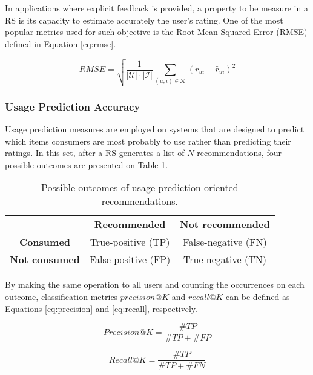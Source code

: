 In applications where explicit feedback is provided, a property to be measure in a RS is its capacity to estimate accurately the user's rating. One of the most popular metrics used for such objective is the Root Mean Squared Error (RMSE)  defined in Equation \ref{eq:rmse}.

\begin{equation}
\label{eq:rmse}
    RMSE = \sqrt{\frac{1}{|\mathcal{U}| \cdot |\mathcal{I}|}\sum_{(u,i) \in \mathcal{K}}(r_{ui} - \hat{r}_{ui})^2}
\end{equation}

\subsubsection{Usage Prediction Accuracy}

Usage prediction measures are employed on systems that are designed to predict which items consumers are most probably to use rather than predicting their ratings. In this set, after a RS generates a list of $N$ recommendations, four possible outcomes are presented on Table \ref{tab:usage_table}.

\begin{table}[h]
	\centering
	\begin{tabular}{@{}ccc@{}}
		& \textbf{Recommended}                     & \textbf{Not recommended}                 \\ 
		\multicolumn{1}{c|}{\textbf{Consumed}}     & \multicolumn{1}{c|}{True-positive (TP)}  & \multicolumn{1}{c|}{False-negative (FN)} \\ 
		\multicolumn{1}{c|}{\textbf{Not consumed}} & \multicolumn{1}{c|}{False-positive (FP)} & \multicolumn{1}{c|}{True-negative (TN)}  \\ 
	\end{tabular}
	\caption{Possible outcomes of usage prediction-oriented recommendations.}
	\label{tab:usage_table}
\end{table}

By making the same operation to all users and counting the occurrences on each outcome, classification metrics $precision@K$ and $recall@K$ can be defined as Equations \ref{eq:precision} and \ref{eq:recall}, respectively.

\begin{equation}
\label{eq:precision}
Precision@K = \frac{\#TP}{\#TP + \#FP}
\end{equation}

\begin{equation}
\label{eq:recall}
Recall@K = \frac{\#TP}{\#TP + \#FN}
\end{equation}

